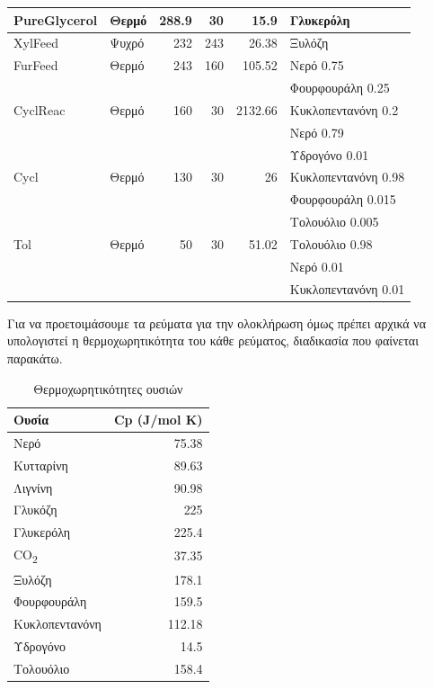 \documentclass[11pt]{article}
\begin{document}
\begin{longtable}{llrrrl}
\hline
PureGlycerol & Θερμό & 288.9 & 30 & 15.9 & Γλυκερόλη\\
\hline
XylFeed & Ψυχρό & 232 & 243 & 26.38 & Ξυλόζη\\
\hline
FurFeed & Θερμό & 243 & 160 & 105.52 & Νερό 0.75\\
 &  &  &  &  & Φουρφουράλη 0.25\\
\hline
CyclReac & Θερμό & 160 & 30 & 2132.66 & Κυκλοπεντανόνη 0.2\\
 &  &  &  &  & Νερό 0.79\\
 &  &  &  &  & Υδρογόνο 0.01\\
\hline
Cycl & Θερμό & 130 & 30 & 26 & Κυκλοπεντανόνη 0.98\\
 &  &  &  &  & Φουρφουράλη 0.015\\
 &  &  &  &  & Τολουόλιο 0.005\\
\hline
Tol & Θερμό & 50 & 30 & 51.02 & Τολουόλιο 0.98\\
 &  &  &  &  & Νερό 0.01\\
 &  &  &  &  & Κυκλοπεντανόνη 0.01\\
\hline
\end{longtable}

Για να προετοιμάσουμε τα ρεύματα για την ολοκλήρωση όμως πρέπει αρχικά να υπολογιστεί η θερμοχωρητικότητα του κάθε ρεύματος, διαδικασία που φαίνεται παρακάτω.

\begin{table}[htbp]
\caption{Θερμοχωρητικότητες ουσιών}
\centering
\begin{tabular}{lr}
Ουσία & Cp (J/mol K)\\
\hline
Νερό & 75.38\\
Κυτταρίνη & 89.63\\
Λιγνίνη & 90.98\\
Γλυκόζη & 225\\
Γλυκερόλη & 225.4\\
CO\textsubscript{2} & 37.35\\
Ξυλόζη & 178.1\\
Φουρφουράλη & 159.5\\
Κυκλοπεντανόνη & 112.18\\
Υδρογόνο & 14.5\\
Τολουόλιο & 158.4\\
\hline
\end{tabular}
\end{table}
\end{document}
